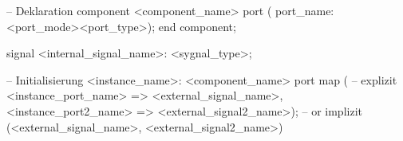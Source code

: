\begin{minipage}{0.01\textwidth}
	\text{ } %
\end{minipage}
\begin{minipage}{0.48\textwidth}
	\begin{VHDL}
-- Deklaration
component <component_name>
	port (
		{port_name: <port_mode><port_type>});
end component;

signal <internal_signal_name>: <sygnal_type>;	
	\end{VHDL}
\end{minipage}
\begin{minipage}{0.02\textwidth}
	\text{ } %
\end{minipage}
\begin{minipage}{0.48\textwidth}
	\begin{VHDL}
-- Initialisierung
<instance_name>: <component_name>
	port map (	-- explizit
		<instance_port_name> => <external_signal_name>,
		<instance_port2_name> => <external_signal2_name>);	
		-- or implizit
		(<external_signal_name>, <external_signal2_name>)
	\end{VHDL}
\end{minipage}